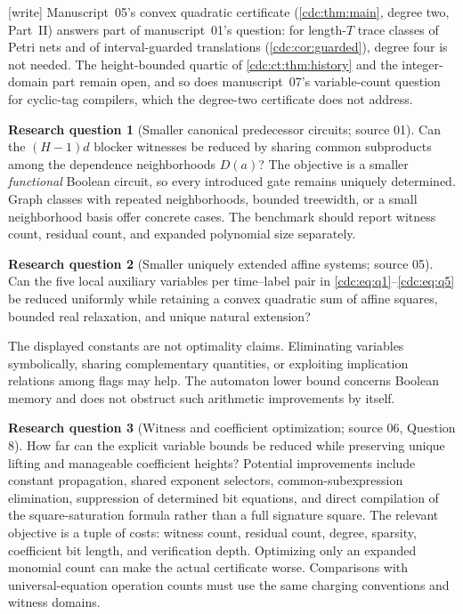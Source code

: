 \documentclass[11pt,a4paper]{article}
\theoremstyle{definition}
\newtheorem{question}[question]{Research question}
\theoremstyle{remark}
\newcommand{\wtag}{\textup{[write]}}%
\begin{document}
\wtag{} Manuscript~05's convex quadratic certificate
(\cref{cdc:thm:main}, degree two, Part~II) answers part of manuscript~01's
question: for length-$T$ trace classes of Petri nets and of
interval-guarded translations (\cref{cdc:cor:guarded}), degree four is not
needed. The height-bounded quartic of \cref{cdc:ct:thm:history} and the
integer-domain part remain open, and so does manuscript~07's variable-count
question for cyclic-tag compilers, which the degree-two certificate does not
address.

\begin{question}[Smaller canonical predecessor circuits; source 01]
Can the $(H-1)d$ blocker witnesses be reduced by sharing common subproducts among the dependence neighborhoods $D(a)$? The objective is a smaller \emph{functional} Boolean circuit, so every introduced gate remains uniquely determined. Graph classes with repeated neighborhoods, bounded treewidth, or a small neighborhood basis offer concrete cases. The benchmark should report witness count, residual count, and expanded polynomial size separately.
\end{question}

\begin{question}[Smaller uniquely extended affine systems; source 05]
Can the five local auxiliary variables per time--label pair in \eqref{cdc:eq:q1}--\eqref{cdc:eq:q5} be reduced uniformly while retaining a convex quadratic sum of affine squares, bounded real relaxation, and unique natural extension?
\end{question}
The displayed constants are not optimality claims. Eliminating variables symbolically, sharing complementary quantities, or exploiting implication relations among flags may help. The automaton lower bound concerns Boolean memory and does not obstruct such arithmetic improvements by itself.

\begin{question}[Witness and coefficient optimization; source 06, Question 8]
How far can the explicit variable bounds be reduced
while preserving unique lifting and manageable coefficient heights? Potential
improvements include constant propagation, shared exponent selectors,
common-subexpression elimination, suppression of determined bit equations,
and direct compilation of the square-saturation formula rather than a full
signature square. The relevant objective is a tuple of costs: witness count,
residual count, degree, sparsity, coefficient bit length, and verification
depth. Optimizing only an expanded monomial count can make the actual
certificate worse. Comparisons with universal-equation operation counts must
use the same charging conventions and witness domains.
\end{question}
\end{document}
